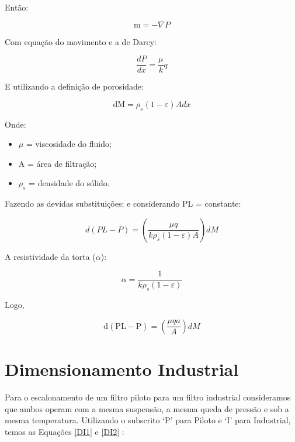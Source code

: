 Então:

\begin{equation}\label{key}
\mathrm{m}=-\nabla P
\end{equation}

Com equação do movimento e a de  Darcy:

\begin{equation}\label{key}
\frac{d P}{d x}=\frac{\mu}{k} q
\end{equation}


E utilizando a definição de porosidade:

\begin{equation}\label{key}
\mathrm{dM}=\rho_{s}(1-\varepsilon) A d x
\end{equation}

Onde:

\begin{itemize}
\item $\mu$ = viscosidade do fluido;
\item A = área de filtração;
\item $\rho_{s}$ = densidade do sólido.
\end{itemize}

Fazendo as devidas substituições: e considerando PL = constante:

\begin{equation}\label{key}
d(P L-P)=\left(\frac{\mu q}{k \rho_{s}(1-\varepsilon) A}\right) d M
\end{equation}

A resistividade da torta ($\alpha$):

\begin{equation}\label{key}
\alpha=\frac{1}{k \rho_{s}(1-\varepsilon)}
\end{equation}

Logo,

\begin{equation}\label{key}
\mathrm{d}(\mathrm{PL}-\mathrm{P})=\left(\frac{\mu q a}{A}\right) d M
\end{equation}


\section{Dimensionamento Industrial}


Para o escalonamento de um filtro piloto para um filtro industrial consideramos que ambos operam com a mesma suspensão, a mesma queda de pressão e sob a mesma temperatura. Utilizando o subscrito ‘P’ para Piloto e ‘I’ para Industrial, temos as Equações \ref{DI1} e \ref{DI2} :

